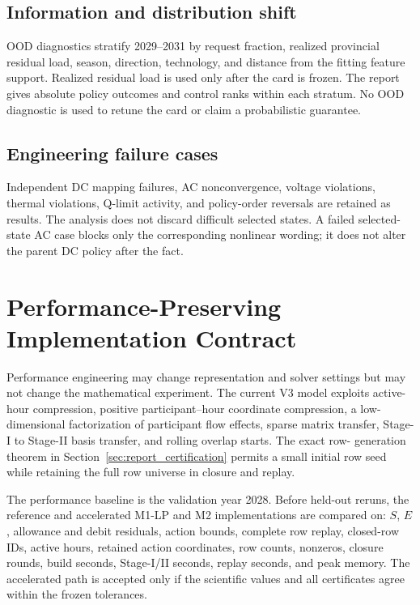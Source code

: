 \documentclass[10pt,journal,onecolumn]{IEEEtran}
\begin{document}
\subsection{Information and distribution shift}
OOD diagnostics stratify 2029--2031 by request fraction, realized provincial
residual load, season, direction, technology, and distance from the fitting
feature support. Realized residual load is used only after the card is frozen.
The report gives absolute policy outcomes and control ranks within each stratum.
No OOD diagnostic is used to retune the card or claim a probabilistic guarantee.

\subsection{Engineering failure cases}
Independent DC mapping failures, AC nonconvergence, voltage violations, thermal
violations, Q-limit activity, and policy-order reversals are retained as results.
The analysis does not discard difficult selected states. A failed selected-state
AC case blocks only the corresponding nonlinear wording; it does not alter the
parent DC policy after the fact.

\section{Performance-Preserving Implementation Contract}
\label{sec:report_performance}

Performance engineering may change representation and solver settings but may
not change the mathematical experiment. The current V3 model exploits active-
hour compression, positive participant--hour coordinate compression, a low-
dimensional factorization of participant flow effects, sparse matrix transfer,
Stage-I to Stage-II basis transfer, and rolling overlap starts. The exact row-
generation theorem in Section~\ref{sec:report_certification} permits a small
initial row seed while retaining the full row universe in closure and replay.

The performance baseline is the validation year 2028. Before held-out reruns,
the reference and accelerated M1-LP and M2 implementations are compared on:
$S$, $E$, allowance and debit residuals, action bounds, complete row replay,
closed-row IDs, active hours, retained action coordinates, row counts, nonzeros,
closure rounds, build seconds, Stage-I/II seconds, replay seconds, and peak
memory. The accelerated path is accepted only if the scientific values and all
certificates agree within the frozen tolerances.
\end{document}
